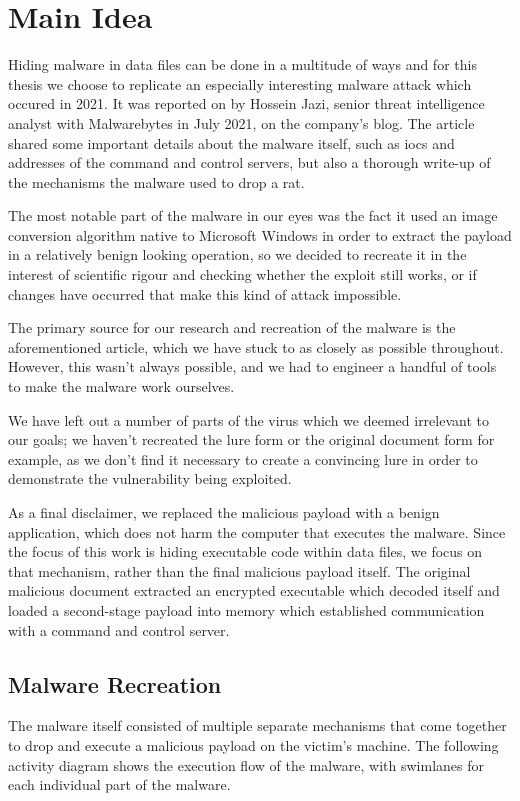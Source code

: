 \chapter{Main Idea}
Hiding malware in data files can be done in a multitude of ways and for this thesis we choose to replicate an especially
interesting malware attack which occured in 2021. It was reported on by Hossein Jazi, senior threat intelligence
analyst with Malwarebytes in July 2021, on the company's blog. The article shared some important details about the malware 
itself, such as \acrfull{iocs} and addresses of the command and control servers, but also a thorough write-up of the mechanisms 
the malware used to drop a \acrfull{rat}.

The most notable part of the malware in our eyes was the fact it used an image conversion algorithm native to Microsoft
Windows in order to extract the payload in a relatively benign looking operation, so we decided to recreate it 
in the interest of scientific rigour and checking whether the exploit still works, or if changes have occurred
that make this kind of attack impossible.

The primary source for our research and recreation of the malware is the aforementioned article, which we have stuck to
as closely as possible throughout. However, this wasn't always possible, and we had to engineer a handful of tools
to make the malware work ourselves. 

We have left out a number of parts of the virus which we deemed irrelevant to our goals; we haven't recreated the lure
form or the original document form for example, as we don't find it necessary to create a convincing lure in order to
demonstrate the vulnerability being exploited.

As a final disclaimer, we replaced the malicious payload with a benign application, which does not harm the computer
that executes the malware. Since the focus of this work is hiding executable code within data files, we focus on
that mechanism, rather than the final malicious payload itself. The original malicious document extracted an encrypted
executable which decoded itself and loaded a second-stage payload into memory which established communication with a
command and control server.

\section{Malware Recreation}
The malware itself consisted of multiple separate mechanisms that come together to drop and execute a malicious payload
on the victim's machine. The following activity diagram shows the execution flow of the malware, 
with swimlanes for each individual part of the malware.

